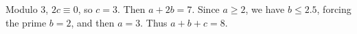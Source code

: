 Modulo 3, $2c\equiv0$, so $c=3$. Then $a+2b=7$. Since $a\ge2$, we have $b\le2.5$, forcing the prime $b=2$, and then $a=3$. Thus $a+b+c=\boxed8$.
